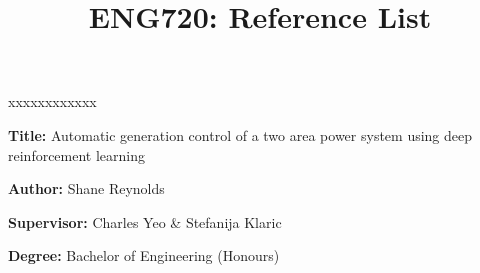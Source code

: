 \documentclass[12pt]{article}
\title{ENG720: Reference List}
\author{}
\date{}
\begin{document}
	\maketitle

	\begin{namelist}{xxxxxxxxxxxx}
		\item[{\bf Title:}]
			Automatic generation control of a two area power system using deep reinforcement learning
		\item[{\bf Author:}]
			Shane Reynolds
		\item[{\bf Supervisor:}]
			Charles Yeo \& Stefanija Klaric
		\item[{\bf Degree:}]
			Bachelor of Engineering (Honours)
	\end{namelist}


	\cite{*}

      {}                    
    \printbibliography
    
\end{document}
